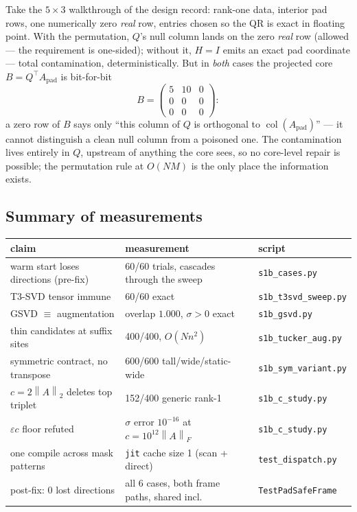\documentclass[11pt]{article}
\theoremstyle{definition}
\theoremstyle{remark}
\newcommand{\Apad}{A_{\mathrm{pad}}}
\newcommand{\col}{\operatorname{col}}
\newcommand{\norm}[1]{\left\lVert #1 \right\rVert}
\newcommand{\code}[1]{\texttt{#1}}
\begin{document}
Take the $5\times 3$ walkthrough of the design record: rank-one data, interior pad rows, one
numerically zero \emph{real} row, entries chosen so the QR is exact in floating point. With the
permutation, $Q$'s null column lands on the zero \emph{real} row (allowed --- the requirement is
one-sided); without it, $H = I$ emits an exact pad coordinate --- total contamination,
deterministically. But in \emph{both} cases the projected core $B = Q^{\top}\Apad$ is bit-for-bit
\[
B = \begin{pmatrix} 5 & 10 & 0\\ 0&0&0\\ 0&0&0\end{pmatrix}:
\]
a zero row of $B$ says only ``this column of $Q$ is orthogonal to $\col(\Apad)$'' --- it cannot
distinguish a clean null column from a poisoned one. The contamination lives entirely in $Q$,
upstream of anything the core sees, so no core-level repair is possible; the permutation rule at
$O(NM)$ is the only place the information exists.

\subsection{Summary of measurements}\label{app:meas}

\begin{center}
\small
\begin{tabular}{@{}lll@{}}
\toprule
claim & measurement & script \\
\midrule
warm start loses directions (pre-fix) & 60/60 trials, cascades through the sweep & \code{s1b\_cases.py} \\
T3-SVD tensor immune & 60/60 exact & \code{s1b\_t3svd\_sweep.py} \\
GSVD $\equiv$ augmentation & overlap $1.000$, $\sigma>0$ exact & \code{s1b\_gsvd.py} \\
thin candidates at suffix sites & 400/400, $O(Nn^2)$ & \code{s1b\_tucker\_aug.py} \\
symmetric contract, no transpose & 600/600 tall/wide/static-wide & \code{s1b\_sym\_variant.py} \\
$c=2\norm{A}_2$ deletes top triplet & 152/400 generic rank-1 & \code{s1b\_c\_study.py} \\
$\varepsilon c$ floor refuted & $\sigma$ error $10^{-16}$ at $c=10^{12}\norm{A}_F$ & \code{s1b\_c\_study.py} \\
one compile across mask patterns & \code{jit} cache size 1 (scan + direct) & \code{test\_dispatch.py} \\
post-fix: 0 lost directions & all 6 cases, both frame paths, shared incl. & \code{TestPadSafeFrame} \\
\bottomrule
\end{tabular}
\end{center}
\end{document}
